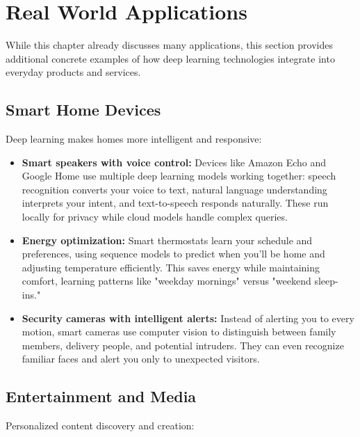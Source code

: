 
\section{Real World Applications}
\label{sec:applications-real-world}

While this chapter already discusses many applications, this section provides additional concrete examples of how deep learning technologies integrate into everyday products and services.

\subsection{Smart Home Devices}

Deep learning makes homes more intelligent and responsive:

\begin{itemize}
    \item \textbf{Smart speakers with voice control:} Devices like Amazon Echo and Google Home use multiple deep learning models working together: speech recognition converts your voice to text, natural language understanding interprets your intent, and text-to-speech responds naturally. These run locally for privacy while cloud models handle complex queries.
    
    \item \textbf{Energy optimization:} Smart thermostats learn your schedule and preferences, using sequence models to predict when you'll be home and adjusting temperature efficiently. This saves energy while maintaining comfort, learning patterns like "weekday mornings" versus "weekend sleep-ins."
    
    \item \textbf{Security cameras with intelligent alerts:} Instead of alerting you to every motion, smart cameras use computer vision to distinguish between family members, delivery people, and potential intruders. They can even recognize familiar faces and alert you only to unexpected visitors.
\end{itemize}

\subsection{Entertainment and Media}

Personalized content discovery and creation:

